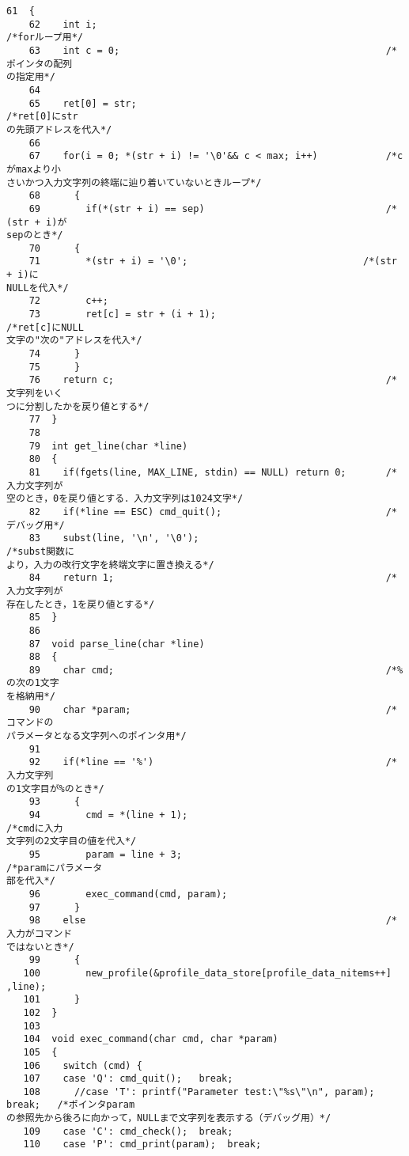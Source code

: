 \begin{Verbatim}[fontsize=\small, baselinestretch=0.8]
    61	{
    62	  int i;                                                   /*forループ用*/
    63	  int c = 0;                                               /*ポインタの配列
の指定用*/
    64	
    65	  ret[0] = str;                                            /*ret[0]にstr
の先頭アドレスを代入*/
    66	
    67	  for(i = 0; *(str + i) != '\0'&& c < max; i++)            /*cがmaxより小
さいかつ入力文字列の終端に辿り着いていないときループ*/
    68	    {
    69	      if(*(str + i) == sep)                                /*(str + i)が
sepのとき*/
    70		{
    71		  *(str + i) = '\0';                               /*(str + i)に
NULLを代入*/
    72		  c++;
    73		  ret[c] = str + (i + 1);                          /*ret[c]にNULL
文字の"次の"アドレスを代入*/
    74		}
    75	    }
    76	  return c;                                                /*文字列をいく
つに分割したかを戻り値とする*/
    77	}
    78	
    79	int get_line(char *line)
    80	{
    81	  if(fgets(line, MAX_LINE, stdin) == NULL) return 0;       /*入力文字列が
空のとき，0を戻り値とする．入力文字列は1024文字*/
    82	  if(*line == ESC) cmd_quit();                             /*デバッグ用*/
    83	  subst(line, '\n', '\0');                                 /*subst関数に
より，入力の改行文字を終端文字に置き換える*/
    84	  return 1;                                                /*入力文字列が
存在したとき，1を戻り値とする*/
    85	}
    86	
    87	void parse_line(char *line)
    88	{
    89	  char cmd;                                                /*%の次の1文字
を格納用*/
    90	  char *param;                                             /*コマンドの
パラメータとなる文字列へのポインタ用*/
    91	
    92	  if(*line == '%')                                         /*入力文字列
の1文字目が%のとき*/
    93	    {
    94	      cmd = *(line + 1);                                   /*cmdに入力
文字列の2文字目の値を代入*/
    95	      param = line + 3;                                    /*paramにパラメータ
部を代入*/
    96	      exec_command(cmd, param);
    97	    }
    98	  else                                                     /*入力がコマンド
ではないとき*/
    99	    {
   100	      new_profile(&profile_data_store[profile_data_nitems++] ,line);
   101	    }
   102	}
   103	
   104	void exec_command(char cmd, char *param)
   105	{
   106	  switch (cmd) {
   107	  case 'Q': cmd_quit();   break;
   108	    //case 'T': printf("Parameter test:\"%s\"\n", param); break;   /*ポインタparam
の参照先から後ろに向かって，NULLまで文字列を表示する（デバッグ用）*/
   109	  case 'C': cmd_check();  break;
   110	  case 'P': cmd_print(param);  break;

\end{Verbatim}
